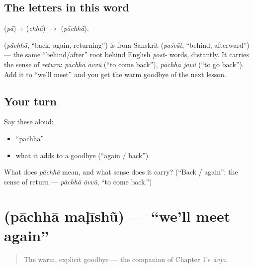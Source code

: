 \subsection*{The letters in this word}
\textbf{} (\emph{pā}) + \textbf{} (\emph{chhā}) $\to$ \textbf{} (\emph{pāchhā}).

\begin{cousinweb}
\textbf{} (\emph{pāchhā}, \textquotedblleft{}back, again, returning\textquotedblright{}) is from Sanskrit \textbf{} (\emph{paścāt}, \textquotedblleft{}behind, afterward\textquotedblright{}) — the same \textquotedblleft{}behind/after\textquotedblright{} root behind English \emph{post-} words, distantly. It carries the sense of \emph{return}: \emph{pāchhā āvvũ} (\textquotedblleft{}to come back\textquotedblright{}), \emph{pāchhā jāvũ} (\textquotedblleft{}to go back\textquotedblright{}). Add it to \textquotedblleft{}we'll meet\textquotedblright{} and you get the warm goodbye of the next lesson.
\end{cousinweb}

\subsection*{Your turn}
Say these aloud:

\begin{itemize}
\raggedright
  \item \textquotedblleft{}pāchhā\textquotedblright{}
  \item what it adds to a goodbye (\textquotedblleft{}again / back\textquotedblright{})
\end{itemize}

\begin{tcolorbox}[breakable,colback=teal!4,colframe=teal!35!black,title={Before you move on}]
What does \emph{pāchhā} mean, and what sense does it carry? (\textquotedblleft{}Back / again\textquotedblright{}; the sense of return — \emph{pāchhā āvvũ}, \textquotedblleft{}to come back.\textquotedblright{})
\end{tcolorbox}
\section[\gu{પાછા} \gu{મળીશું}]{  (pāchhā maḷīshũ) — \textquotedblleft{}we'll meet again\textquotedblright{}}

\label{lesson:GU-C04-pachha-malishun}



\begin{quote}
The warm, explicit goodbye — the companion of Chapter 1's \emph{āvjo}.
\end{quote}

